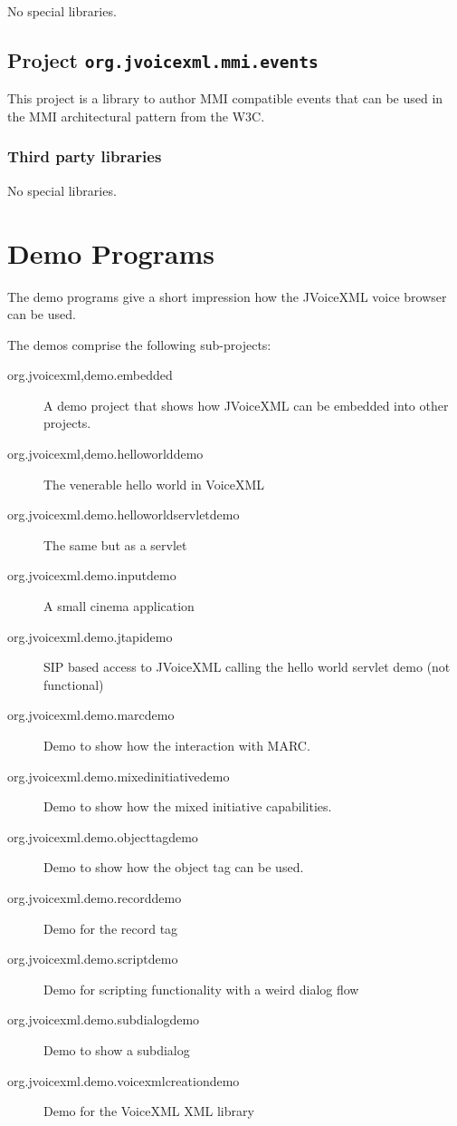 \documentclass[11pt,a4paper]{article}
\begin{document}
No special libraries.


\subsection{Project \texttt{org.jvoicexml.mmi.events}}
\label{sec:mmi-events}

This project is a library to author MMI compatible events that can be used in
the MMI architectural pattern from the W3C.

\subsubsection{Third party libraries}

No special libraries.

\section{Demo Programs}

The demo programs give a short impression how the JVoiceXML voice browser can
be used.

The demos comprise the following sub-projects:

\begin{description}
\item[org.jvoicexml,demo.embedded] A demo project that shows how JVoiceXML can
be embedded into other projects.
\item[org.jvoicexml,demo.helloworlddemo] The venerable hello world in Voice\-XML
\item[org.jvoicexml.demo.helloworldservletdemo] The same but as a servlet
\item[org.jvoicexml.demo.inputdemo] A small cinema application
\item[org.jvoicexml.demo.jtapidemo] SIP based access to JVoiceXML calling the
hello world servlet demo (not functional)
\item[org.jvoicexml.demo.marcdemo] Demo to show how the interaction with MARC.
\item[org.jvoicexml.demo.mixedinitiativedemo] Demo to show how the mix\-ed
initiative capabilities.
\item[org.jvoicexml.demo.objecttagdemo] Demo to show how the object tag can be
used.
\item[org.jvoicexml.demo.recorddemo] Demo for the record tag
\item[org.jvoicexml.demo.scriptdemo] Demo for scripting functionality with a
weird dialog flow
\item[org.jvoicexml.demo.subdialogdemo] Demo to show a subdialog
\item[org.jvoicexml.demo.voicexmlcreationdemo] Demo for the VoiceXML XML library
\end{description}
\end{document}
